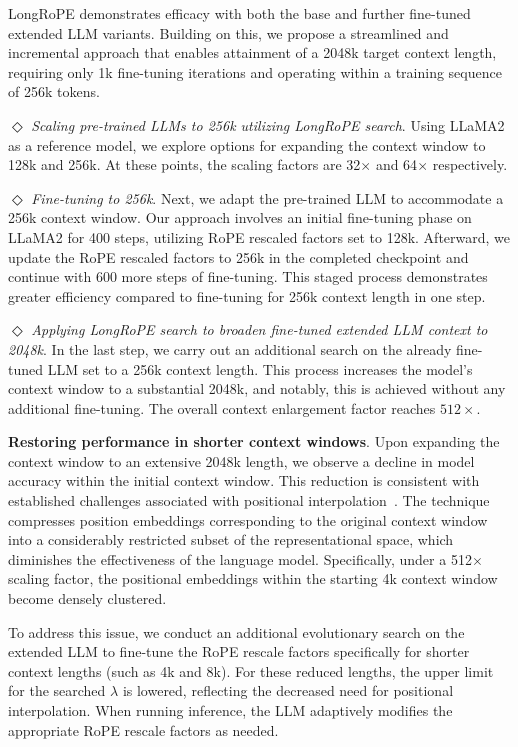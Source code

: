LongRoPE demonstrates efficacy with both the base and further fine-tuned extended LLM variants. Building on this, we propose a streamlined and incremental approach that enables attainment of a 2048k target context length, requiring only 1k fine-tuning iterations and operating within a training sequence of 256k tokens.

$\Diamond$ \textit{Scaling pre-trained LLMs to 256k utilizing LongRoPE search}. Using LLaMA2 as a reference model, we explore options for expanding the context window to 128k and 256k. At these points, the scaling factors are 32$\times$ and 64$\times$ respectively.

$\Diamond$ \textit{Fine-tuning to 256k}. Next, we adapt the pre-trained LLM to accommodate a 256k context window. Our approach involves an initial fine-tuning phase on LLaMA2 for 400 steps, utilizing RoPE rescaled factors set to 128k. Afterward, we update the RoPE rescaled factors to 256k in the completed checkpoint and continue with 600 more steps of fine-tuning. This staged process demonstrates greater efficiency compared to fine-tuning for 256k context length in one step.

$\Diamond$ \textit{Applying LongRoPE search to broaden fine-tuned extended LLM context to 2048k}. In the last step, we carry out an additional search on the already fine-tuned LLM set to a 256k context length. This process increases the model’s context window to a substantial 2048k, and notably, this is achieved without any additional fine-tuning. The overall context enlargement factor reaches $512\times$.

\textbf{Restoring performance in shorter context windows}. Upon expanding the context window to an extensive 2048k length, we observe a decline in model accuracy within the initial context window. This reduction is consistent with established challenges associated with positional interpolation~\cite{pi}. The technique compresses position embeddings corresponding to the original context window into a considerably restricted subset of the representational space, which diminishes the effectiveness of the language model. Specifically, under a 512$\times$ scaling factor, the positional embeddings within the starting 4k context window become densely clustered.

To address this issue, we conduct an additional evolutionary search on the extended LLM to fine-tune the RoPE rescale factors specifically for shorter context lengths (such as 4k and 8k). For these reduced lengths, the upper limit for the searched $\lambda$ is lowered, reflecting the decreased need for positional interpolation. When running inference, the LLM adaptively modifies the appropriate RoPE rescale factors as needed.

